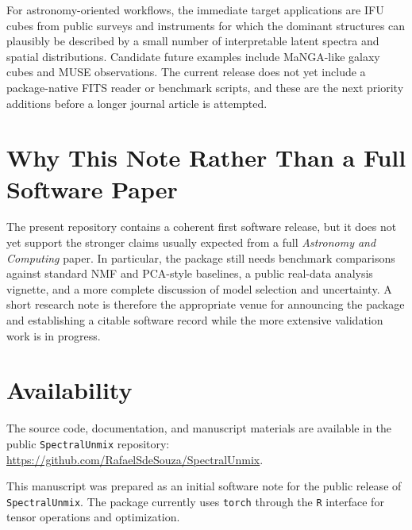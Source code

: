 \documentclass[rnaas]{aastex7}
\begin{document}
For astronomy-oriented workflows, the immediate target applications are IFU
cubes from public surveys and instruments for which the dominant structures can
plausibly be described by a small number of interpretable latent spectra and
spatial distributions. Candidate future examples include MaNGA-like galaxy
cubes and MUSE observations. The current release does not yet include a
package-native FITS reader or benchmark scripts, and these are the next
priority additions before a longer journal article is attempted.

\section{Why This Note Rather Than a Full Software Paper}

The present repository contains a coherent first software release, but it does
not yet support the stronger claims usually expected from a full
\emph{Astronomy and Computing} paper. In particular, the package still needs
benchmark comparisons against standard NMF and PCA-style baselines, a public
real-data analysis vignette, and a more complete discussion of model selection
and uncertainty. A short research note is therefore the appropriate venue for
announcing the package and establishing a citable software record while the
more extensive validation work is in progress.

\section{Availability}

The source code, documentation, and manuscript materials are available in the
public \texttt{SpectralUnmix} repository:
\url{https://github.com/RafaelSdeSouza/SpectralUnmix}.

\acknowledgments
This manuscript was prepared as an initial software note for the public release
of \texttt{SpectralUnmix}. The package currently uses \texttt{torch} through
the \texttt{R} interface for tensor operations and optimization.


\end{document}
